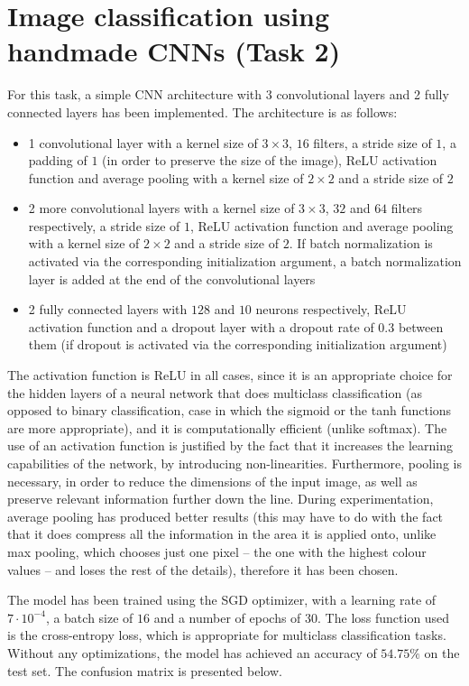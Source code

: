 \documentclass[12pt]{article}
\begin{document}
\section{Image classification using handmade CNNs (Task 2)}
For this task, a simple CNN architecture with 3 convolutional layers and 2 fully connected layers has been implemented. The architecture is as follows:
\begin{itemize}
    \item 1 convolutional layer with a kernel size of $3 \times 3$, $16$ filters, a stride size of $1$, a padding of $1$ (in order to preserve the size of the image),
    ReLU activation function and average pooling with a kernel size of $2 \times 2$ and a stride size of $2$
    \item 2 more convolutional layers with a kernel size of $3 \times 3$, $32$ and $64$ filters respectively, a stride size of $1$, ReLU activation function and average
    pooling with a kernel size of $2 \times 2$ and a stride size of $2$. If batch normalization is activated via the corresponding initialization argument, a batch
    normalization layer is added at the end of the convolutional layers
    \item 2 fully connected layers with $128$ and $10$ neurons respectively, ReLU activation function and a dropout layer with a dropout rate of $0.3$ between them (if
    dropout is activated via the corresponding initialization argument)
\end{itemize}

The activation function is ReLU in all cases, since it is an appropriate choice for the hidden layers of a neural network that does multiclass classification (as
opposed to binary classification, case in which the sigmoid or the tanh functions are more appropriate), and it is computationally efficient (unlike softmax). The use
of an activation function is justified by the fact that it increases the learning capabilities of the network, by introducing non-linearities. Furthermore, pooling is
necessary, in order to reduce the dimensions of the input image, as well as preserve relevant information further down the line. During experimentation, average pooling
has produced better results (this may have to do with the fact that it does compress all the information in the area it is applied onto, unlike max pooling, which
chooses just one pixel -- the one with the highest colour values -- and loses the rest of the details), therefore it has been chosen.

The model has been trained using the SGD optimizer, with a learning rate of $7 \cdot 10^{-4}$, a batch size of $16$ and a number of epochs of $30$. The loss function
used is the cross-entropy loss, which is appropriate for multiclass classification tasks. Without any optimizations, the model has achieved an accuracy of $54.75\%$
on the test set. The confusion matrix is presented below.
\end{document}
